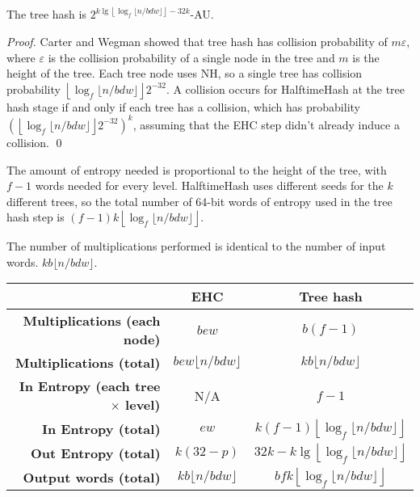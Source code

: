 \documentclass[runningheads]{llncs}
\begin{document}
\begin{lemma}
The tree hash is $2^{ k\lg\left\lfloor\log_f \lfloor n/b d w\rfloor\right\rfloor - 32k}$-AU.
\end{lemma}
\begin{proof}
  Carter and Wegman showed that tree hash has collision probability of $m \varepsilon$, where $\varepsilon$ is the collision probability of a single node in the tree and $m$ is the height of the tree.
  Each tree node uses NH, so a single tree has collision probability $\left\lfloor \log_f \lfloor n / b d w \rfloor \right\rfloor 2^{-32}$.
  A collision occurs for HalftimeHash at the tree hash stage if and only if each tree has a collision, which has probability $\left(\left\lfloor \log_f \lfloor n / b d w \rfloor \right\rfloor 2^{-32}\right)^k$, assuming that the EHC step didn't already induce a collision. \qed
\end{proof}

The amount of entropy needed is proportional to the height of the tree, with $f - 1$ words needed for every level.
HalftimeHash uses different seeds for the $k$ different trees, so the total number of 64-bit words of entropy used in the tree hash step is $(f - 1) k\left\lfloor\log_f \lfloor n/b d w\rfloor\right\rfloor$.

The number of multiplications performed is identical to the number of input words. $k b \lfloor n / b d w \rfloor$.

\begin{tabular}{|r|c|c|}
  \hline & {\bf EHC} & {\bf Tree hash}\\
  \hline {\bf Multiplications (each node)} & $b e w$ & $b (f-1)$ \\
  \hline {\bf Multiplications (total)} & $b e w \lfloor n / b d w\rfloor$ & $k b \lfloor n / b d w \rfloor$ \\
  \hline {\bf In Entropy (each tree $\times$ level)} & N/A & $f-1$ \\
  \hline {\bf In Entropy (total)} & $e w$ & $k (f-1) \left\lfloor \log_f \lfloor n / b d w \rfloor \right\rfloor$ \\
  \hline {\bf Out Entropy (total)} & $k (32-p)$ & $32k - k\lg\left\lfloor\log_f \lfloor n/b d w\rfloor\right\rfloor$\\
  \hline {\bf Output words (total)} & $k b \lfloor n / b d w\rfloor $ & $b f k \left\lfloor \log_f \lfloor n / b d w \rfloor \right\rfloor$\\
  \hline
\end{tabular}
\end{document}
